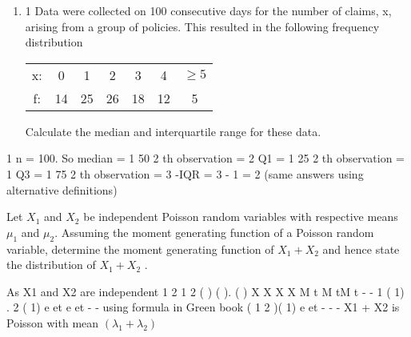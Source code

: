 \documentclass[a4paper,12pt]{article}
\begin{document}
\begin{enumerate}

\item 1 Data were collected on 100 consecutive days for the number of claims, x, arising
from a group of policies. This resulted in the following frequency distribution
\begin{center}
\begin{tabular}{c|c|c|c|c|c|c}
x: & 0 & 1 & 2 & 3 & 4 & $\geq 5$ \\
f: & 14 & 25 & 26 & 18 &  12 & 5 \\
\end{tabular}
\end{center}
Calculate the median and interquartile range for these data. 



\end{enumerate}

\newpage

1 n = 100. So median =
1
50
2
th observation = 2
Q1 =
1
25
2
th observation = 1
Q3 =
1
75
2
th observation = 3 -IQR = 3 - 1 = 2
(same answers using alternative definitions)


 Let $X_1$ and $X_2$ be independent Poisson random variables with respective means $\mu_1$ and $\mu_2$.
Assuming the moment generating function of a Poisson random variable, determine the moment generating function of $X_1 + X_2$ and hence state the distribution of $X_1 + X_2$ . 


 As X1 and X2 are independent
1 2 1 2
( ) ( ). ( ) X X X X M t M tM t -
-
1 ( 1) . 2 ( 1) e et e et -%
- using formula in Green book
( 1 2 )( 1) e et - %
-
- X1 + X2 is Poisson with mean $(\lambda_1 + \lambda_2)$
\end{document}

